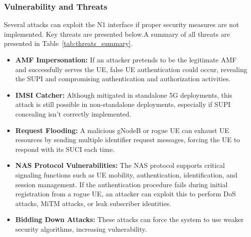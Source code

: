 \documentclass{report}
\begin{document}
\subsubsection{Vulnerability and Threats}
Several attacks can exploit the N1 interface if proper security measures are not implemented. Key threats are presented below.A summary of all threats are presented in Table~\ref{tab:threats_summary}.
\begin{itemize}
    \item \textbf{AMF Impersonation:} If an attacker pretends to be the legitimate AMF and successfully serves the UE, false UE authentication could occur, revealing the SUPI and compromising authentication and authorization activities.\cite{mahyoub2024security}
    \item \textbf{IMSI Catcher:} Although mitigated in standalone 5G deployments, this attack is still possible in non-standalone deployments, especially if SUPI concealing isn't correctly implemented.
    \item \textbf{Request Flooding:} A malicious gNodeB or rogue UE can exhaust UE resources by sending\cite{mahyoub2024security} multiple identifier request messages, forcing the UE to respond with its SUCI each time.
    \item \textbf{NAS Protocol Vulnerabilities:} The NAS protocol supports critical signaling functions such as UE mobility, authentication, identification, and session management. If the authentication procedure fails during initial registration from a rogue UE, an attacker can exploit this to perform DoS attacks, MiTM attacks, or leak subscriber identities.
    \item \textbf{Bidding Down Attacks:} These attacks can force the system to use weaker security algorithms, increasing vulnerability.\cite{mahyoub2024security}
\end{itemize}
\end{document}

